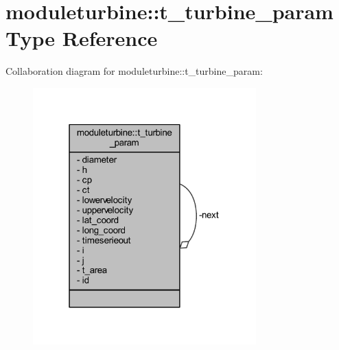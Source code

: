 \hypertarget{structmoduleturbine_1_1t__turbine__param}{}\section{moduleturbine\+:\+:t\+\_\+turbine\+\_\+param Type Reference}
\label{structmoduleturbine_1_1t__turbine__param}


Collaboration diagram for moduleturbine\+:\+:t\+\_\+turbine\+\_\+param\+:\nopagebreak
\begin{figure}[H]
\begin{center}
\leavevmode
\includegraphics[width=244pt]{structmoduleturbine_1_1t__turbine__param__coll__graph}
\end{center}
\end{figure}
